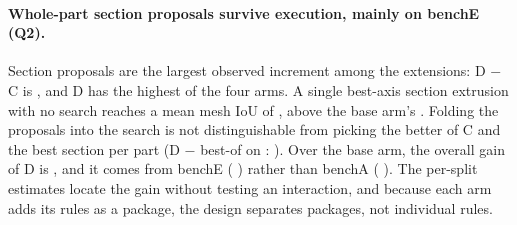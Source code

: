 \paragraph{Whole-part section proposals survive execution, mainly on benchE (Q2).}
Section proposals are the largest observed \iouc{} increment among the extensions: D $-$ C is \dSecBeamCadDiff{} \dSecBeamCadCI, and D has the highest \iouc{} of the four arms. A single best-axis section extrusion with no search reaches a mean mesh IoU of \sectionsOnlyIou, above the base arm's \armBaseIou. Folding the proposals into the search is not distinguishable from picking the better of C and the best section per part (D $-$ best-of on \iouc: \dSecBestOfCadDiff{} \dSecBestOfCadCI). Over the base arm, the overall \iouc{} gain of D is \dSecBaseCadDiff{} \dSecBaseCadCI, and it comes from benchE (\dSecBaseSplitECadDiff{} \dSecBaseSplitECadCI) rather than benchA (\dSecBaseSplitACadDiff{} \dSecBaseSplitACadCI). The per-split estimates locate the gain without testing an interaction, and because each arm adds its rules as a package, the design separates packages, not individual rules.
